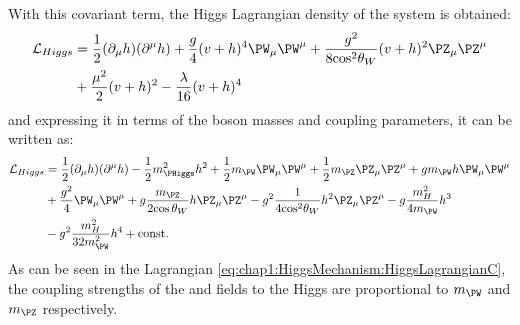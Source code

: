 With this covariant term, the Higgs Lagrangian density of the system is obtained:
\begin{equation*}\label{eq:chap1:HiggsMechanism:HiggsLagrangianB}
\begin{split}
	\mathcal{L}_{Higgs} 	&= \frac{1}{2} (\partial_{\mu}h) (\partial^{\mu}h) + \frac{g}{4}(v+h)^{4}\PW_{\mu}\PW^{\mu} + \frac{g^{2}}{8 \textrm{cos}^{2}\theta_{W}}(v+h)^{2}\PZ_{\mu}\PZ^{\mu} \\
					&+\frac{\mu^{2}}{2}(v+h)^{2} - \frac{\lambda}{16}(v+h)^{4}
\end{split}
\end{equation*}
and expressing it in terms of the boson masses and coupling parameters, it can be written as:
\begin{equation}\label{eq:chap1:HiggsMechanism:HiggsLagrangianC}
\begin{split}
	\mathcal{L}_{Higgs} 	&= \frac{1}{2} (\partial_{\mu}h) (\partial^{\mu}h)   - \frac{1}{2}m^{2}_{\PHiggs}h^{2}+\frac{1}{2}m_{\PW}\PW_{\mu}\PW^{\mu}+\frac{1}{2}m_{\PZ}\PZ_{\mu}\PZ^{\mu} + g m_{\PW} h \PW_{\mu}\PW^{\mu} \\
					&+ \frac{g^{2}}{4}\PW_{\mu}\PW^{\mu} + g \frac{m_{\PZ}}{2 \textrm{cos}\,\theta_{W}} h \PZ_{\mu}\PZ^{\mu} - g^{2}\frac{1}{4 \textrm{cos}^{2}\theta_{W}}h^{2}\PZ_{\mu}\PZ^{\mu} 
					 -g \frac{m^{2}_{H}}{4 m_{\PW}}h^{3} \\
					& -g^{2}\frac{m^{2}_{H}}{32 m^{2}_{\PW}}h^{4}+\textrm{const.}
\end{split}
\end{equation}
As can be seen in the Lagrangian \ref{eq:chap1:HiggsMechanism:HiggsLagrangianC}, the coupling strengths of the \PW and \PZ fields to the Higgs are proportional to $m_{\PW}$ and $m_{\PZ}$ respectively.


